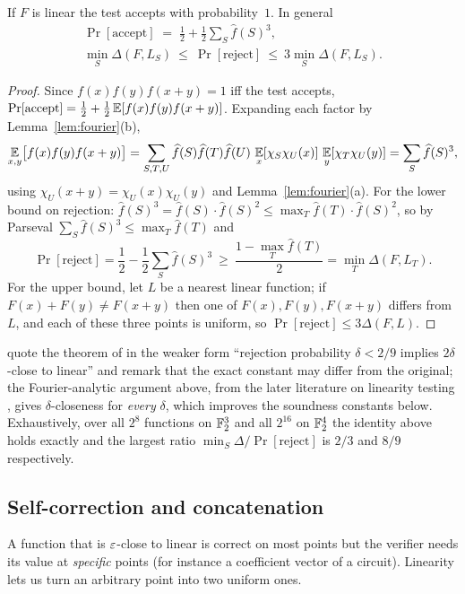 \begin{theorem}\label{thm:blr}
If $F$ is linear the test accepts with probability~$1$.  In general
\begin{gather*}
  \Pr[\text{accept}]\;=\;\frac12+\frac12\sum_S\widehat f(S)^3,\\
  \min_{S}\Delta(F,L_S)\ \le\ \Pr[\text{reject}]\ \le\ 3\min_S\Delta(F,L_S).
\end{gather*}
\end{theorem}
\begin{proof}
Since $f(x)f(y)f(x+y)=1$ iff the test accepts, $\Pr[\text{accept}]=\tfrac12+\tfrac12\operatorname*{\mathbb{E}}[f(x)f(y)f(x+y)]$.  Expanding each factor by Lemma~\ref{lem:fourier}(b),
\[
  \operatorname*{\mathbb{E}}_{x,y}\bigl[f(x)f(y)f(x+y)\bigr]=\sum_{S,T,U}\widehat f(S)\widehat f(T)\widehat f(U)\,\operatorname*{\mathbb{E}}_x[\chi_S\chi_U(x)]\,\operatorname*{\mathbb{E}}_y[\chi_T\chi_U(y)]=\sum_S\widehat f(S)^3,
\]
using $\chi_U(x+y)=\chi_U(x)\chi_U(y)$ and Lemma~\ref{lem:fourier}(a).  For the lower bound on rejection: $\widehat f(S)^3=\widehat f(S)\cdot\widehat f(S)^2\le\max_T\widehat f(T)\cdot\widehat f(S)^2$, so by Parseval $\sum_S\widehat f(S)^3\le\max_T\widehat f(T)$ and
\[
  \Pr[\text{reject}]=\frac12-\frac12\sum_S\widehat f(S)^3\ \ge\ \frac{1-\max_T\widehat f(T)}2=\min_T\Delta(F,L_T).
\]
For the upper bound, let $L$ be a nearest linear function; if $F(x)+F(y)\ne F(x+y)$ then one of $F(x),F(y),F(x+y)$ differs from $L$, and each of these three points is uniform, so $\Pr[\text{reject}]\le3\Delta(F,L)$.
\end{proof}

\begin{remark}
\citet{ALMSS98} quote the theorem of \citet{BLR90} in the weaker form ``rejection probability $\delta<2/9$ implies $2\delta$-close to linear'' and remark that the exact constant may differ from the original;
the Fourier-analytic argument above, from the later literature on linearity testing \citep{BCHKS96}, gives $\delta$-closeness for \emph{every} $\delta$, which improves the soundness constants below.
Exhaustively, over all $2^8$ functions on $\mathbb{F}_2^3$ and all $2^{16}$ on $\mathbb{F}_2^4$ the identity above holds exactly and the largest ratio $\min_S\Delta/\Pr[\text{reject}]$ is $2/3$ and $8/9$ respectively.
\end{remark}

\subsection{Self-correction and concatenation}

A function that is $\varepsilon$-close to linear is correct on most points but the verifier needs its value at \emph{specific} points (for instance a coefficient vector of a circuit).
Linearity lets us turn an arbitrary point into two uniform ones.


